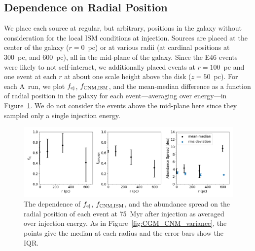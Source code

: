\documentclass[twocolumn]{aastex62}
\newcommand{\runonenu}{A}
\begin{document}
\subsection{Dependence on Radial Position}
\label{sec:radial position}
We place each source at regular, but arbitrary, positions in the galaxy without consideration for the local ISM conditions at injection. Sources are placed at the center of the galaxy ($r = 0$~pc) or at various radii (at cardinal positions at 300~pc, and 600~pc), all in the mid-plane of the galaxy. Since the E46 events were likely to not self-interact, we additionally placed events at $r = 100$~pc and one event at each $r$ at about one scale height above the disk ($z = 50$~pc). For each \runonenu~run, we plot $f_{\rm ej}$, $f_{\rm CNM, ISM}$, and the mean-median difference as a function of radial position in the galaxy for each event---averaging over energy---in Figure~\ref{fig:radial position}. We do not consider the events above the mid-plane here since they sampled only a single injection energy.


\begin{figure}
   \centering
   \includegraphics[width=0.95\linewidth]{Eej_rms_combined_radial_dependence}
   \caption{The dependence of $f_{\rm ej}$, $f_{\rm CNM, ISM}$, and the abundance spread on the radial position of each event at 75~Myr after injection as averaged over injection energy. As in Figure~\ref{fig:CGM_CNM_variance}, the points give the median at each radius and the error bars show the IQR.}
   \label{fig:radial position}
 \end{figure}
\end{document}
